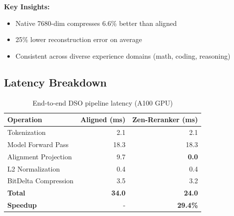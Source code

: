\textbf{Key Insights:}
\begin{itemize}
\item Native 7680-dim compresses 6.6\% better than aligned
\item 25\% lower reconstruction error on average
\item Consistent across diverse experience domains (math, coding, reasoning)
\end{itemize}

\subsection{Latency Breakdown}

\begin{table}[h]
\centering
\caption{End-to-end DSO pipeline latency (A100 GPU)}
\begin{tabular}{lrr}
\toprule
\textbf{Operation} & \textbf{Aligned (ms)} & \textbf{Zen-Reranker (ms)} \\
\midrule
Tokenization & 2.1 & 2.1 \\
Model Forward Pass & 18.3 & 18.3 \\
Alignment Projection & 9.7 & \textbf{0.0} \\
L2 Normalization & 0.4 & 0.4 \\
BitDelta Compression & 3.5 & 3.2 \\
\midrule
\textbf{Total} & \textbf{34.0} & \textbf{24.0} \\
\textbf{Speedup} & - & \textbf{29.4\%} \\
\bottomrule
\end{tabular}
\end{table}

